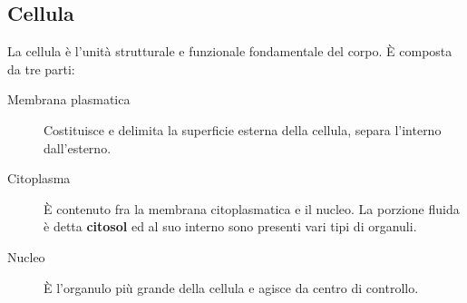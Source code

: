 \documentclass[a4paper]{article}
\begin{document}
\subsection{Cellula}
La cellula è l’unità strutturale e funzionale fondamentale del corpo. È
composta da tre parti:
\begin{description}
\item[Membrana plasmatica] Costituisce e delimita la superficie esterna della 
cellula, separa l’interno dall’esterno.
\item[Citoplasma] È contenuto fra la membrana citoplasmatica e il nucleo. 
La porzione fluida è detta \textbf{citosol} ed al suo interno sono presenti 
vari tipi di organuli.
\item[Nucleo] È l’organulo più grande della cellula e agisce da centro di 
controllo.
\end{description}
\end{document}
